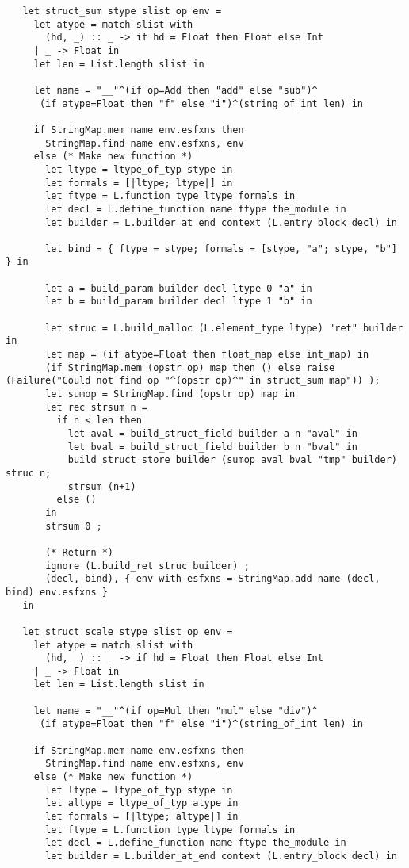 \documentclass[main.tex]{subfiles}
\begin{document}
\begin{lstlisting}
   let struct_sum stype slist op env =
     let atype = match slist with
       (hd, _) :: _ -> if hd = Float then Float else Int
     | _ -> Float in
     let len = List.length slist in
     
     let name = "__"^(if op=Add then "add" else "sub")^
      (if atype=Float then "f" else "i")^(string_of_int len) in

     if StringMap.mem name env.esfxns then
       StringMap.find name env.esfxns, env
     else (* Make new function *)
       let ltype = ltype_of_typ stype in
       let formals = [|ltype; ltype|] in
       let ftype = L.function_type ltype formals in
       let decl = L.define_function name ftype the_module in
       let builder = L.builder_at_end context (L.entry_block decl) in

       let bind = { ftype = stype; formals = [stype, "a"; stype, "b"] } in

       let a = build_param builder decl ltype 0 "a" in
       let b = build_param builder decl ltype 1 "b" in

       let struc = L.build_malloc (L.element_type ltype) "ret" builder in
       let map = (if atype=Float then float_map else int_map) in
       (if StringMap.mem (opstr op) map then () else raise (Failure("Could not find op "^(opstr op)^" in struct_sum map")) );
       let sumop = StringMap.find (opstr op) map in
       let rec strsum n = 
         if n < len then 
           let aval = build_struct_field builder a n "aval" in
           let bval = build_struct_field builder b n "bval" in
           build_struct_store builder (sumop aval bval "tmp" builder) struc n;
           strsum (n+1)
         else ()
       in
       strsum 0 ;

       (* Return *)
       ignore (L.build_ret struc builder) ;
       (decl, bind), { env with esfxns = StringMap.add name (decl, bind) env.esfxns }
   in

   let struct_scale stype slist op env =
     let atype = match slist with
       (hd, _) :: _ -> if hd = Float then Float else Int
     | _ -> Float in
     let len = List.length slist in
     
     let name = "__"^(if op=Mul then "mul" else "div")^
      (if atype=Float then "f" else "i")^(string_of_int len) in

     if StringMap.mem name env.esfxns then
       StringMap.find name env.esfxns, env
     else (* Make new function *)
       let ltype = ltype_of_typ stype in
       let altype = ltype_of_typ atype in
       let formals = [|ltype; altype|] in
       let ftype = L.function_type ltype formals in
       let decl = L.define_function name ftype the_module in
       let builder = L.builder_at_end context (L.entry_block decl) in


\end{lstlisting}
\end{document}
